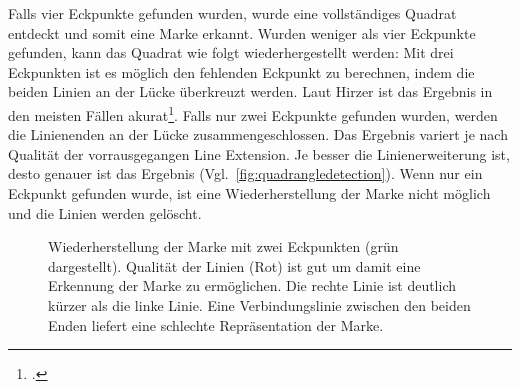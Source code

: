Falls vier Eckpunkte gefunden wurden, wurde eine vollständiges Quadrat entdeckt und somit eine Marke erkannt. Wurden
 weniger als vier Eckpunkte gefunden, kann das Quadrat wie folgt wiederhergestellt werden: Mit drei Eckpunkten ist es
 möglich den fehlenden Eckpunkt zu berechnen, indem die beiden Linien an der Lücke überkreuzt werden. Laut Hirzer ist
 das Ergebnis in den meisten Fällen akurat\footcite[Vgl.][S.15]{hirzer08}. Falls nur zwei Eckpunkte gefunden wurden,
 werden die Linienenden an der Lücke zusammengeschlossen. Das Ergebnis variert je nach Qualität der vorrausgegangen
 Line Extension. Je besser die Linienerweiterung ist, desto genauer ist das Ergebnis
 (Vgl.~\autoref{fig:quadrangledetection}). Wenn nur ein Eckpunkt gefunden wurde, ist eine Wiederherstellung der Marke
 nicht möglich und die Linien werden gelöscht.
\begin{figure}[!ht]
	\centering
	\caption{Wiederherstellung der Marke mit zwei Eckpunkten (grün dargestellt).
	  Qualität der Linien (Rot) ist gut um damit eine Erkennung der Marke zu
	 ermöglichen.  Die rechte Linie ist deutlich kürzer als die linke Linie. Eine
	 Verbindungslinie zwischen den beiden Enden liefert eine schlechte Repräsentation der Marke.}
	\label{fig:quadrangledetection}
\end{figure}


